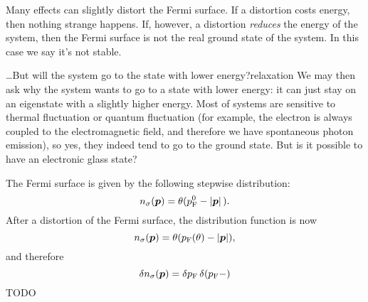 \documentclass[hyperref, a4paper]{article}
\newcommand*{\pfermi}{p_{\text{F}}}
\begin{document}
Many effects can slightly distort the Fermi surface.
If a distortion costs energy, 
then nothing strange happens.
If, however, a distortion \emph{reduces} the energy of the system, 
then the Fermi surface is not the real ground state of the system.
In this case we say it's not stable.

\begin{theorybox}{\dots But will the system go to the state with lower energy?}{relaxation}
    We may then ask why the system wants to go to a state with lower energy:
    it can just stay on an eigenstate with a slightly higher energy.
    Most of systems are sensitive to thermal fluctuation 
    or quantum fluctuation 
    (for example, the electron is always coupled to the electromagnetic field, 
    and therefore we have spontaneous photon emission),
    so yes, they indeed tend to go to the ground state.
    But is it possible to have an electronic glass state?
\end{theorybox}

The Fermi surface is given by the following stepwise distribution:
\begin{equation}
    n_\sigma(\vb*{p}) = \theta(\pfermi^0 - \abs*{\vb*{p}}).
\end{equation}
After a distortion of the Fermi surface, 
the distribution function is now 
\begin{equation}
    n_\sigma(\vb*{p}) = \theta (\pfermi(\theta) - \abs{\vb*{p}}),
\end{equation}
and therefore 
\begin{equation}
    \var{n_\sigma(\vb*{p})} = 
    \var{\pfermi} \delta(\pfermi - )
\end{equation}
TODO
\end{document}
